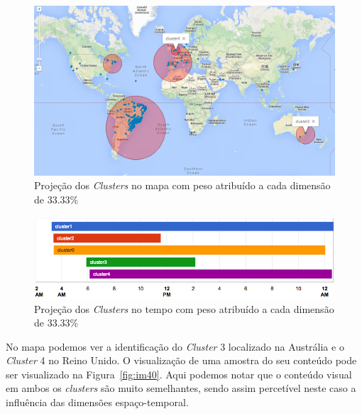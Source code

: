 \begin{figure}[!h]
\centering
\includegraphics[width=1\linewidth]{./figures/olhopassarinho/map_ex1_im33_e33_t33_1819}
\caption{Projeção dos \textit{Clusters} no mapa com peso atribuído a cada dimensão de 33.33\%}
\label{fig:map4}
\end{figure}

\begin{figure}[h]
\centering
\includegraphics[width=1\linewidth]{./figures/olhopassarinho/temp_ex1_im33_e33_t33_1819}
\caption{Projeção dos \textit{Clusters} no tempo com peso atribuído a cada dimensão de 33.33\%}
\label{fig:temp4}
\end{figure}

No mapa podemos ver a identificação do \textit{Cluster} 3 localizado na Austrália e o \textit{Cluster} 4 no Reino Unido. O visualização de uma amostra do seu conteúdo pode ser visualizado na Figura~\ref{fig:im40}. Aqui podemos notar que o conteúdo visual em ambos os \textit{clusters} são muito semelhantes, sendo assim percetível neste caso a influência das dimensões espaço-temporal. 

